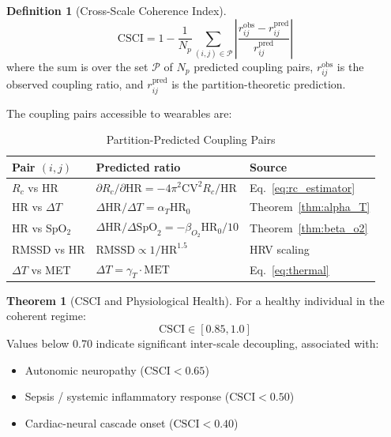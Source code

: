 \documentclass[10pt,twocolumn,a4paper]{article}
\theoremstyle{definition}
\newtheorem{theorem}{Theorem}
\newtheorem{definition}{Definition}
\newcommand{\Rc}{R_c}
\newcommand{\CSCI}{\text{CSCI}}
\begin{document}
\begin{definition}[Cross-Scale Coherence Index]
\label{def:csci}
\begin{equation}
\label{eq:csci}
\boxed{
\CSCI = 1 - \frac{1}{N_p}\sum_{(i,j) \in \mathcal{P}}
\left|\frac{r_{ij}^{\text{obs}} - r_{ij}^{\text{pred}}}
{r_{ij}^{\text{pred}}}\right|
}
\end{equation}
where the sum is over the set $\mathcal{P}$ of $N_p$ predicted
coupling pairs, $r_{ij}^{\text{obs}}$ is the observed coupling ratio,
and $r_{ij}^{\text{pred}}$ is the partition-theoretic prediction.
\end{definition}

The coupling pairs accessible to wearables are:

\begin{table}[H]
\centering
\caption{Partition-Predicted Coupling Pairs}
\label{tab:coupling_pairs}
\begin{tabular}{llp{3.5cm}}
\toprule
\textbf{Pair $(i,j)$} & \textbf{Predicted ratio} & \textbf{Source}\\
\midrule
$\Rc$ vs HR & $\partial \Rc / \partial\text{HR}
= -4\pi^2\text{CV}^2 \Rc/\text{HR}$ & Eq.~\eqref{eq:rc_estimator}\\
HR vs $\Delta T$ & $\Delta\text{HR}/\Delta T = \alpha_T \text{HR}_0$ & Theorem~\ref{thm:alpha_T}\\
HR vs SpO$_2$ & $\Delta\text{HR}/\Delta\text{SpO}_2
= -\beta_{O_2}\text{HR}_0/10$ & Theorem~\ref{thm:beta_o2}\\
RMSSD vs HR & $\text{RMSSD} \propto 1/\text{HR}^{1.5}$ &
HRV scaling~\cite{shaffer2017overview}\\
$\Delta T$ vs MET & $\Delta T = \gamma_T \cdot \text{MET}$ &
Eq.~\eqref{eq:thermal}\\
\bottomrule
\end{tabular}
\end{table}

\begin{theorem}[CSCI and Physiological Health]
\label{thm:csci}
For a healthy individual in the coherent regime:
\begin{equation}
\CSCI \in [0.85, 1.0]
\end{equation}
Values below 0.70 indicate significant inter-scale decoupling,
associated with:
\begin{itemize}[nosep]
\item Autonomic neuropathy ($\CSCI < 0.65$)
\item Sepsis / systemic inflammatory response ($\CSCI < 0.50$)
\item Cardiac-neural cascade onset ($\CSCI < 0.40$)
\end{itemize}
\end{theorem}
\end{document}
